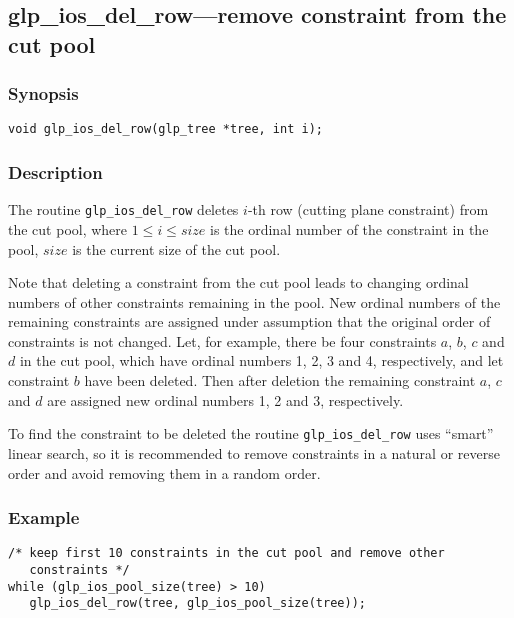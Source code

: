 \subsection{glp\_ios\_del\_row---remove constraint from the cut pool}

\subsubsection*{Synopsis}

\begin{verbatim}
void glp_ios_del_row(glp_tree *tree, int i);
\end{verbatim}

\subsubsection*{Description}

The routine \verb|glp_ios_del_row| deletes $i$-th row (cutting plane
constraint) from the cut pool, where $1\leq i\leq size$ is the ordinal
number of the constraint in the pool, $size$ is the current size of the
cut pool.

Note that deleting a constraint from the cut pool leads to changing
ordinal numbers of other constraints remaining in the pool. New ordinal
numbers of the remaining constraints are assigned under assumption that
the original order of constraints is not changed. Let, for example,
there be four constraints $a$, $b$, $c$ and $d$ in the cut pool, which
have ordinal numbers 1, 2, 3 and 4, respectively, and let constraint
$b$ have been deleted. Then after deletion the remaining constraint $a$,
$c$ and $d$ are assigned new ordinal numbers 1, 2 and 3, respectively.

To find the constraint to be deleted the routine \verb|glp_ios_del_row|
uses ``smart'' linear search, so it is recommended to remove constraints
in a natural or reverse order and avoid removing them in a random order.

\subsubsection*{Example}

\begin{verbatim}
/* keep first 10 constraints in the cut pool and remove other
   constraints */
while (glp_ios_pool_size(tree) > 10)
   glp_ios_del_row(tree, glp_ios_pool_size(tree));
\end{verbatim}

